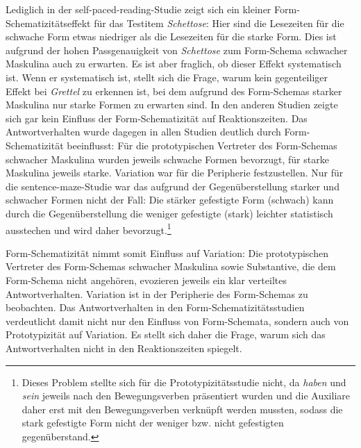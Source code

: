 Lediglich in der self-paced-reading-Studie zeigt sich ein kleiner Form-Sche\-ma\-ti\-zi\-täts\-effekt für das Testitem \textit{Schettose}: Hier sind die Lesezeiten für die schwache Form etwas niedriger als die Lesezeiten für die starke Form. Dies ist aufgrund der hohen Passgenauigkeit von \textit{Schettose} zum Form-Schema schwacher Maskulina auch zu erwarten. Es ist aber fraglich, ob dieser Effekt systematisch ist. Wenn er systematisch ist, stellt sich die Frage, warum kein gegenteiliger Effekt bei \textit{Grettel} zu erkennen ist, bei dem aufgrund des Form-Schemas starker Maskulina nur starke Formen zu erwarten sind. In den anderen Studien zeigte sich gar kein Einfluss der Form-Schematizität auf Reaktionszeiten. Das Antwortverhalten wurde dagegen in allen Studien deutlich durch Form-Schematizität beeinflusst: Für die prototypischen Vertreter des Form-Schemas schwacher Maskulina wurden jeweils schwache Formen bevorzugt, für starke Maskulina jeweils starke. Variation war für die Peripherie festzustellen. Nur für die sentence-maze-Studie war das aufgrund der Gegenüberstellung starker und schwacher Formen nicht der Fall: Die stärker gefestigte Form (schwach) kann durch die Gegenüberstellung die weniger gefestigte (stark) leichter statistisch ausstechen und wird daher bevorzugt.\footnote{Dieses Problem stellte sich für die Prototypizitätsstudie nicht, da \textit{haben} und \textit{sein} jeweils nach den Bewegungsverben präsentiert wurden und die Auxiliare daher erst mit den Bewegungsverben verknüpft werden mussten, sodass die stark gefestigte Form nicht der weniger bzw. nicht gefestigten gegenüberstand.}  



Form-Schematizität nimmt somit Einfluss auf Variation: Die prototypischen Vertreter des Form-Schemas schwacher Maskulina sowie Substantive, die dem Form-Schema nicht angehören, evozieren jeweils ein klar verteiltes Antwortverhalten. Variation ist in der Peripherie des Form-Schemas zu beobachten. Das Antwortverhalten in den Form-Schematizitätsstudien verdeutlicht damit nicht nur den Einfluss von Form-Schemata, sondern auch von Prototypizität auf Variation. Es stellt sich daher die Frage, warum sich das Antwortverhalten nicht in den Reaktionszeiten spiegelt. 

